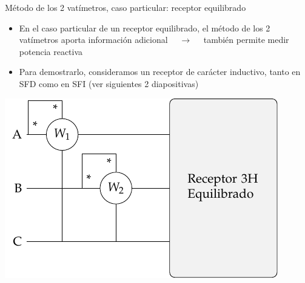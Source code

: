 \documentclass[aspectratio=169, usenames,svgnames,dvipsnames]{beamer}
\begin{document}
\begin{frame}{Método de los 2 vatímetros, caso particular: \hspace{3mm}receptor equilibrado}
    \vspace{2mm}
    \begin{itemize}
        \item En el caso particular de un \alert{receptor equilibrado}, el método de los 2 vatímetros aporta \alert{información adicional} $\quad \rightarrow \quad$ también permite medir \alert{potencia reactiva}

        \vspace{2mm}
        \item Para demostrarlo, consideramos un \alert{receptor} de carácter \alert{inductivo}, tanto en \alert{SFD} como en \alert{SFI} \hspace{3mm}(ver siguientes 2 diapositivas)
    \end{itemize}    

    \begin{center}
        \includegraphics[width=.53\linewidth]{../figs/Potencia_3H_equilibrado_AB.pdf}
    \end{center}
\end{frame}

\end{document}
